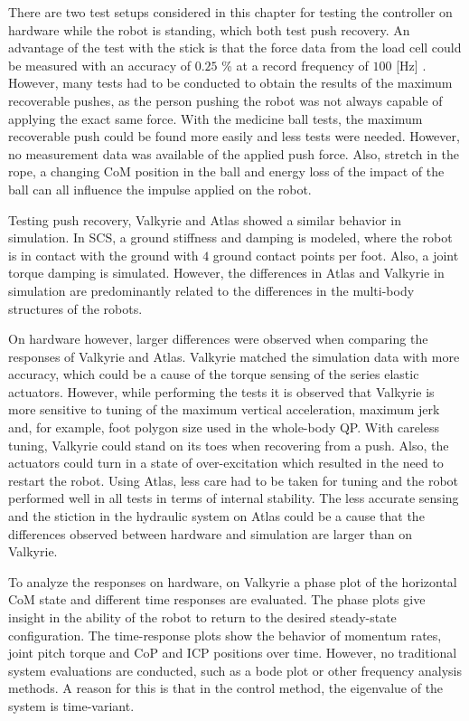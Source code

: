 There are two test setups considered in this chapter for testing the controller on hardware while the robot is standing, which both test push recovery. An advantage of the test with the stick is that the force data from the load cell could be measured with an accuracy of $0.25$ \% at a record frequency of $100$ [Hz] \cite{iload}. However, many tests had to be conducted to obtain the results of the maximum recoverable pushes, as the person pushing the robot was not always capable of applying the exact same force. With the medicine ball tests, the maximum recoverable push could be found more easily and less tests were needed. However, no measurement data was available of the applied push force. Also, stretch in the rope, a changing \ac{CoM} position in the ball and energy loss of the impact of the ball can all influence the impulse applied on the robot.

Testing push recovery, Valkyrie and Atlas showed a similar behavior in simulation. In \ac{SCS}, a ground stiffness and damping is modeled, where the robot is in contact with the ground with $4$ ground contact points per foot. Also, a joint torque damping is simulated. However, the differences in Atlas and Valkyrie in simulation are predominantly related to the differences in the multi-body structures of the robots.

On hardware however, larger differences were observed when comparing the responses of Valkyrie and Atlas. Valkyrie matched the simulation data with more accuracy, which could be a cause of the torque sensing of the series elastic actuators. However, while performing the tests it is observed that Valkyrie is more sensitive to tuning of the maximum vertical acceleration, maximum jerk and, for example, foot polygon size used in the whole-body \ac{QP}. With careless tuning, Valkyrie could stand on its toes when recovering from a push. Also, the actuators could turn in a state of over-excitation which resulted in the need to restart the robot. Using Atlas, less care had to be taken for tuning and the robot performed well in all tests in terms of internal stability. The less accurate sensing and the stiction in the hydraulic system on Atlas could be a cause that the differences observed between hardware and simulation are larger than on Valkyrie.

To analyze the responses on hardware, on Valkyrie a phase plot of the horizontal \ac{CoM} state and different time responses are evaluated. The phase plots give insight in the ability of the robot to return to the desired steady-state configuration. The time-response plots show the behavior of momentum rates, joint pitch torque and \ac{CoP} and \ac{ICP} positions over time. However, no traditional system evaluations are conducted, such as a bode plot or other frequency analysis methods. A reason for this is that in the control method, the eigenvalue of the system is time-variant.

